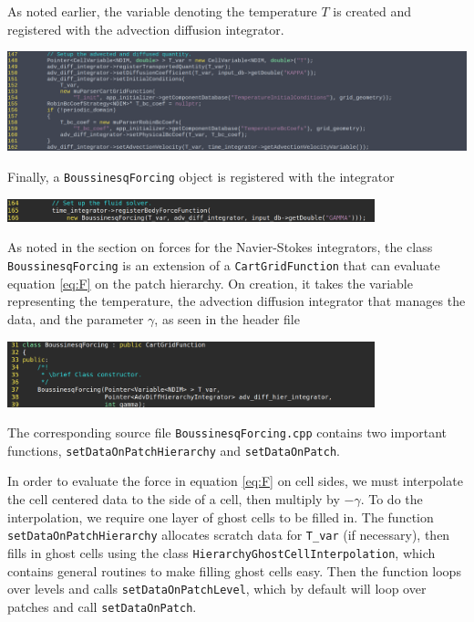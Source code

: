 \documentclass{article}
\begin{document}
As noted earlier, the variable denoting the temperature $T$ is created and registered with the advection diffusion integrator.
\begin{center}
\includegraphics[width=\textwidth]{Graphs/NS-ex5/advected_quantity.png}
\end{center}

Finally, a \verb|BoussinesqForcing| object is registered with the integrator
\begin{center}
\includegraphics[width=0.8\textwidth]{Graphs/NS-ex5/source_registerForce.png}
\end{center}

As noted in the section on forces for the Navier-Stokes integrators, the class \verb|BoussinesqForcing| is an extension of a \verb|CartGridFunction| that can evaluate equation \eqref{eq:F} on the patch hierarchy. On creation, it takes the variable representing the temperature, the advection diffusion integrator that manages the data, and the parameter $\gamma$, as seen in the header file
\begin{center}
\includegraphics[width=0.8\textwidth]{Graphs/NS-ex5/Boussinesq_header_constructor.png}
\end{center}
The corresponding source file \verb|BoussinesqForcing.cpp| contains two important functions, \verb|setDataOnPatchHierarchy| and \verb|setDataOnPatch|.

In order to evaluate the force in equation \eqref{eq:F} on cell sides, we must interpolate the cell centered data to the side of a cell, then multiply by $-\gamma$. To do the interpolation, we require one layer of ghost cells to be filled in. The function \verb|setDataOnPatchHierarchy| allocates scratch data for \verb|T_var| (if necessary), then fills in ghost cells using the class \verb|HierarchyGhostCellInterpolation|, which contains general routines to make filling ghost cells easy. Then the function loops over levels and calls \verb|setDataOnPatchLevel|, which by default will loop over patches and call \verb|setDataOnPatch|.
\end{document}
